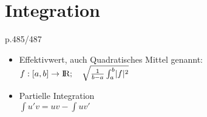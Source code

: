 \section{Integration}
	{\color{red}p.485/487}

\begin{itemize}
	\item Effektivwert,
		auch Quadratisches Mittel genannt: \\
		$f:[a,b]\rightarrow\text{\rmfamily I\!R}; \quad \sqrt{\frac{1}{b-a}\int^b_a\lvert f\rvert^2}$
	\item Partielle Integration\\
		$\int u'v = uv-\int uv'$
\end{itemize}	